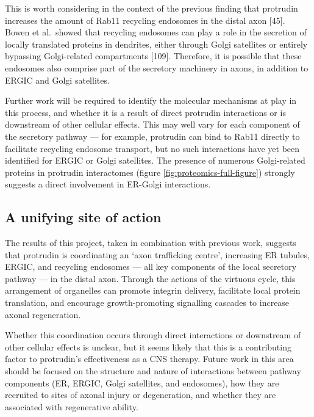 \documentclass[
  12pt,
  a4paper,
]{book}
\begin{document}
This is worth considering in the context of the previous finding that protrudin increases the amount of Rab11 recycling endosomes in the distal axon {[}45{]}. Bowen et al.~showed that recycling endosomes can play a role in the secretion of locally translated proteins in dendrites, either through Golgi satellites or entirely bypassing Golgi-related compartments {[}109{]}. Therefore, it is possible that these endosomes also comprise part of the secretory machinery in axons, in addition to ERGIC and Golgi satellites.

Further work will be required to identify the molecular mechanisms at play in this process, and whether it is a result of direct protrudin interactions or is downstream of other cellular effects. This may well vary for each component of the secretory pathway --- for example, protrudin can bind to Rab11 directly to facilitate recycling endosome transport, but no such interactions have yet been identified for ERGIC or Golgi satellites. The presence of numerous Golgi-related proteins in protrudin interactomes (figure \ref{fig:proteomics-full-figure}) strongly suggests a direct involvement in ER-Golgi interactions.

\hypertarget{a-unifying-site-of-action}{%
\subsection{A unifying site of action}\label{a-unifying-site-of-action}}

The results of this project, taken in combination with previous work, suggests that protrudin is coordinating an `axon trafficking centre', increasing ER tubules, ERGIC, and recycling endosomes --- all key components of the local secretory pathway --- in the distal axon. Through the actions of the virtuous cycle, this arrangement of organelles can promote integrin delivery, facilitate local protein translation, and encourage growth-promoting signalling cascades to increase axonal regeneration.

Whether this coordination occurs through direct interactions or downstream of other cellular effects is unclear, but it seems likely that this is a contributing factor to protrudin's effectiveness as a CNS therapy. Future work in this area should be focused on the structure and nature of interactions between pathway components (ER, ERGIC, Golgi satellites, and endosomes), how they are recruited to sites of axonal injury or degeneration, and whether they are associated with regenerative ability.
\end{document}
